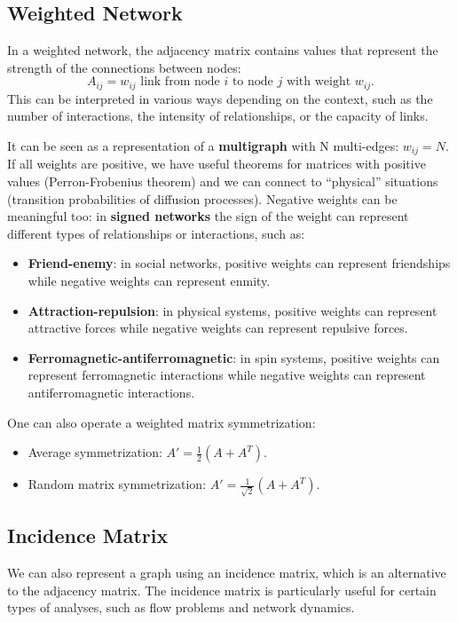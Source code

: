 \subsection{Weighted Network}

In a weighted network, the adjacency matrix contains values that represent the strength of the connections between nodes:
\[
    A_{ij} = w_{ij} \text{ link from node } i \text{ to node } j \text{ with weight } w_{ij}.
\]
This can be interpreted in various ways depending on the context, such as the number of interactions, the intensity of relationships, or the capacity of links.

It can be seen as a representation of a \textbf{multigraph} with N multi-edges: \(w_{ij} = N\). If all weights are positive, we have useful theorems for matrices with positive values (Perron-Frobenius theorem) and we can connect to ``physical'' situations (transition probabilities of diffusion processes).
Negative weights can be meaningful too: in \textbf{signed networks} the sign of the weight can represent different types of relationships or interactions, such as:
\begin{itemize}
    \item \textbf{Friend-enemy}: in social networks, positive weights can represent friendships while negative weights can represent enmity.
    \item \textbf{Attraction-repulsion}: in physical systems, positive weights can represent attractive forces while negative weights can represent repulsive forces.
    \item \textbf{Ferromagnetic-antiferromagnetic}: in spin systems, positive weights can represent ferromagnetic interactions while negative weights can represent antiferromagnetic interactions.
\end{itemize}

One can also operate a weighted matrix symmetrization:
\begin{itemize}
    \item Average symmetrization: $A' = \frac{1}{2}(A + A^T)$.
    \item Random matrix symmetrization: $A' = \frac{1}{\sqrt{2}}(A + A^T)$.
\end{itemize}

\subsection{Incidence Matrix}

We can also represent a graph using an incidence matrix, which is an alternative to the adjacency matrix. The incidence matrix is particularly useful for certain types of analyses, such as flow problems and network dynamics.

